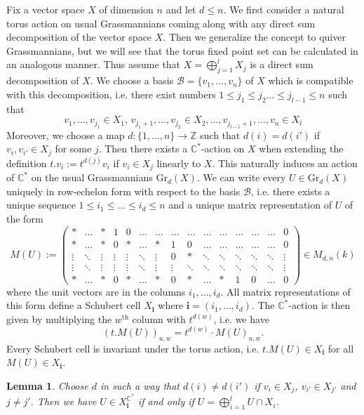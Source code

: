 \documentclass{amsart}
\newtheorem{lemma}[theorem]{Lemma}
\newcommand{\bfi}{\mathbf{i}}
\newcommand{\C}{\mathbb{C}}
\newcommand{\Gr}{\mathrm{Gr}}
\begin{document}
Fix a vector space $X$ of dimension $n$ and let $d\leq n$. We first consider a natural torus action on usual Grassmannians coming along with any direct sum decomposition of the vector space $X$. Then we generalize the concept to quiver Grassmannians, but we will see that the torus fixed point set can be calculated in an analogous manner. Thus assume that $X=\bigoplus_{j=1}^l X_j$ is a direct sum decomposition of $X$. We choose a basis $\mathcal B=\{v_1,\ldots,v_n\}$ of $X$ which is compatible with this decomposition, i.e. there exist numbers $1\leq j_1\leq j_2\ldots\leq j_{l-1}\leq n$ such that
\[v_1,\ldots,v_{j_1}\in X_1,\,v_{j_1+1},\ldots,v_{j_2}\in X_2,\ldots,v_{j_{l-1}+1},\ldots,v_{n}\in X_l\]
Moreover, we choose a map $d:\{1,\ldots,n\}\to\mathbb{Z}$ such that $d(i)=d(i')$ if $v_i,v_{i'}\in X_{j}$ for some $j$. Then there exists a $\C^\ast$-action on $X$ when extending the definition $t.v_i:=t^{d(j)}v_i$ if $v_i\in X_j$ linearly to $X$. This naturally induces an action of $\C^\ast$ on the usual Grassmannians $\Gr_d(X)$. We can write every $U\in\Gr_d(X)$ uniquely in row-echelon form with respect to the basis $\mathcal B$, i.e. there exists a unique sequence $1\leq i_1\leq\ldots\leq i_d\leq n$ and a unique matrix representation of $U$ of the form
\[M(U):=\begin{pmatrix}\ast&\ldots &\ast &1&0 &\ldots&\ldots&\ldots&\ldots&\ldots&\ldots&\ldots&\ldots&\ldots&0\\\ast&\ldots &\ast&0&\ast&\ldots &\ast&1&0&\ldots&\ldots&\ldots&\ldots&\ldots&0\\\vdots &\ddots&\vdots&\vdots&\vdots &\ddots&\vdots&0&\ast&\ddots&\ddots&\ddots&\ddots&\ddots&\vdots\\\vdots &\ddots&\vdots&\vdots&\vdots &\ddots&\vdots&\vdots&\ddots&\ddots&\ddots&\ddots&\ddots&\ddots&\vdots\\\ast&\ldots &\ast&0&\ast&\ldots &\ast&0&\ast&\ldots&\ast&1&0&\ldots&0\end{pmatrix}\in M_{d,n}(k)\]
where the unit vectors are in the columns $i_1,\ldots,i_d$. All matrix representations of this form define a Schubert cell $X_{\bfi}$ where $\bfi=(i_1,\ldots,i_d)$. The $\C^\ast$-action is then given by multiplying the $w^{\mathrm{th}}$ column with $t^{d(w)}$, i.e. we have
\[(t.M(U))_{u,w}=t^{d(w)}\cdot M(U)_{u,w}.\]
Every Schubert cell is invariant under the torus action, i.e. $t.M(U)\in X_\bfi$ for all $M(U)\in X_{\bfi}$. 
\begin{lemma}\label{usualGrass}
Choose $d$ in such a way that $d(i)\neq d(i')$ if $v_i\in X_j$, $v_{i'}\in X_{j'}$ and $j\neq j'$.
Then we have $U\in X_{\bfi}^{\C^\ast}$ if and only if $U=\bigoplus_{i=1}^l U\cap X_i$.
\end{lemma}
\end{document}
